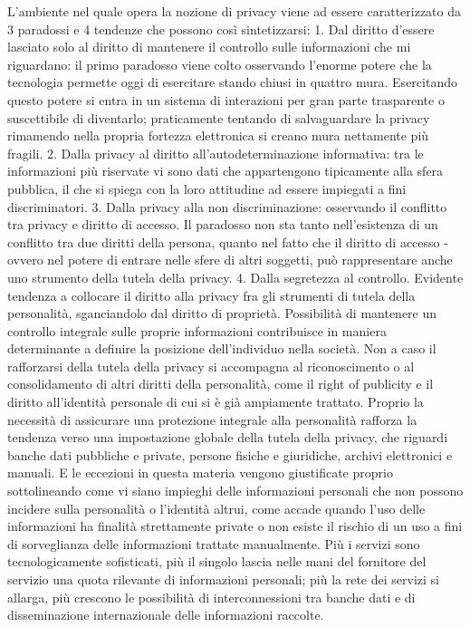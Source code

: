 L’ambiente nel quale opera la nozione di privacy viene ad essere caratterizzato da 3 paradossi e 4 tendenze che possono così sintetizzarsi:
1.	Dal diritto d’essere lasciato solo al diritto di mantenere il controllo sulle informazioni che mi riguardano: il primo paradosso viene colto osservando l'enorme potere che la tecnologia permette oggi di esercitare stando chiusi in quattro mura. Esercitando questo potere si entra in un sistema di interazioni per gran parte trasparente o suscettibile di diventarlo; praticamente tentando di salvaguardare la privacy rimamendo nella propria fortezza elettronica si creano mura nettamente più fragili.
2.	Dalla privacy al diritto all’autodeterminazione informativa: tra le informazioni più riservate vi sono dati che appartengono tipicamente alla sfera pubblica, il che si spiega con la loro attitudine ad essere impiegati a fini discriminatori.
3.	Dalla privacy alla non discriminazione: osservando il conflitto tra privacy e diritto di accesso. Il paradosso non sta tanto nell'esistenza di un conflitto tra due diritti della persona, quanto nel fatto che il diritto di accesso - ovvero nel potere di entrare nelle sfere di altri soggetti, può rappresentare anche uno strumento della tutela della privacy.
4.	Dalla segretezza al controllo.
Evidente tendenza a collocare il diritto alla privacy fra gli strumenti di tutela della personalità, sganciandolo dal diritto di proprietà. Possibilità di mantenere un controllo integrale sulle proprie informazioni contribuisce in maniera determinante a definire la posizione dell’individuo nella società. Non a caso il rafforzarsi della tutela della privacy si accompagna al riconoscimento o al consolidamento di altri diritti della personalità, come il right of publicity e il diritto all’identità personale di cui si è già ampiamente trattato.
Proprio la necessità di assicurare una protezione integrale alla personalità rafforza la tendenza verso una impostazione globale della tutela della privacy, che riguardi banche dati pubbliche e private, persone fisiche e giuridiche, archivi elettronici e manuali. E le eccezioni in questa materia vengono giustificate proprio sottolineando come vi siano impieghi delle informazioni personali che non possono incidere sulla personalità o l’identità altrui, come accade quando l’uso delle informazioni ha finalità strettamente private o non esiste il rischio di un uso a fini di sorveglianza delle informazioni trattate manualmente.
Più i servizi sono tecnologicamente sofisticati, più il singolo lascia nelle mani del fornitore del servizio una quota rilevante di informazioni personali; più la rete dei servizi si allarga, più crescono le possibilità di interconnessioni tra banche dati e di disseminazione internazionale delle informazioni raccolte.
